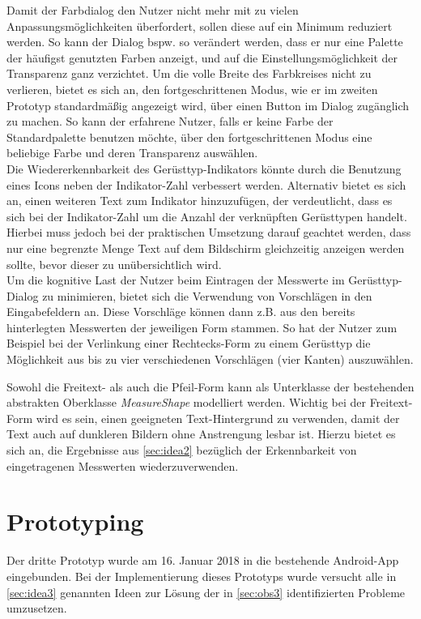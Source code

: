 Damit der Farbdialog den Nutzer nicht mehr mit zu vielen Anpassungsmöglichkeiten überfordert, sollen diese auf ein Minimum reduziert werden.
So kann der Dialog bspw. so verändert werden, dass er nur eine Palette der häufigst genutzten Farben anzeigt, und auf die Einstellungsmöglichkeit der Transparenz ganz verzichtet.
Um die volle Breite des Farbkreises nicht zu verlieren, bietet es sich an, den fortgeschrittenen Modus, wie er im zweiten Prototyp standardmäßig angezeigt wird, über einen Button im Dialog zugänglich zu machen.
So kann der erfahrene Nutzer, falls er keine Farbe der Standardpalette benutzen möchte, über den fortgeschrittenen Modus eine beliebige Farbe und deren Transparenz auswählen. \\

Die Wiedererkennbarkeit des Gerüsttyp-Indikators könnte durch die Benutzung eines Icons neben der Indikator-Zahl verbessert werden.
Alternativ bietet es sich an, einen weiteren Text zum Indikator hinzuzufügen, der verdeutlicht, dass es sich bei der Indikator-Zahl um die Anzahl der verknüpften Gerüsttypen handelt.
Hierbei muss jedoch bei der praktischen Umsetzung darauf geachtet werden, dass nur eine begrenzte Menge Text auf dem Bildschirm gleichzeitig anzeigen werden sollte, bevor dieser zu unübersichtlich wird. \\

Um die kognitive Last der Nutzer beim Eintragen der Messwerte im Gerüsttyp-Dialog zu minimieren, bietet sich die Verwendung von Vorschlägen in den Eingabefeldern an.
Diese Vorschläge können dann z.B. aus den bereits hinterlegten Messwerten der jeweiligen Form stammen.
So hat der Nutzer zum Beispiel bei der Verlinkung einer Rechtecks-Form zu einem Gerüsttyp die Möglichkeit aus bis zu vier verschiedenen Vorschlägen (vier Kanten) auszuwählen.

Sowohl die Freitext- als auch die Pfeil-Form kann als Unterklasse der bestehenden abstrakten Oberklasse \emph{MeasureShape} modelliert werden.
Wichtig bei der Freitext-Form wird es sein, einen geeigneten Text-Hintergrund zu verwenden, damit der Text auch auf dunkleren Bildern ohne Anstrengung lesbar ist.
Hierzu bietet es sich an, die Ergebnisse aus \autoref{sec:idea2} bezüglich der Erkennbarkeit von eingetragenen Messwerten wiederzuverwenden.

\section{Prototyping}
Der dritte Prototyp wurde am 16. Januar 2018 in die bestehende Android-App eingebunden.
Bei der Implementierung dieses Prototyps wurde versucht alle in \autoref{sec:idea3} genannten Ideen zur Lösung der in \autoref{sec:obs3} identifizierten Probleme umzusetzen. \\

